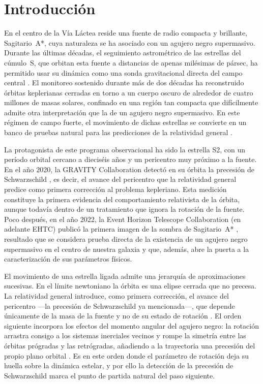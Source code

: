 \chapter{Introducción}
\label{sec:introduccion}

En el centro de la Vía Láctea reside una fuente de radio compacta y brillante, Sagitario~A*, cuya naturaleza se ha asociado con un agujero negro supermasivo. Durante las últimas décadas, el seguimiento astrométrico de las estrellas del cúmulo~S, que orbitan esta fuente a distancias de apenas milésimas de pársec, ha permitido usar su dinámica como una sonda gravitacional directa del campo central \cite{gillessen2017monitoring}. El monitoreo sostenido durante más de dos décadas ha reconstruido órbitas keplerianas cerradas en torno a un cuerpo oscuro de alrededor de cuatro millones de masas solares, confinado en una región tan compacta que difícilmente admite otra interpretación que la de un agujero negro supermasivo. En este régimen de campo fuerte, el movimiento de dichas estrellas se convierte en un banco de pruebas natural para las predicciones de la relatividad general \cite{parsa2017investigating}.

La protagonista de este programa observacional ha sido la estrella S2, con un período orbital cercano a dieciséis años y un pericentro muy próximo a la fuente. En el año 2020, la GRAVITY Collaboration detectó en su órbita la precesión de Schwarzschild \cite{gravity2020schwarzschild}, es decir, el avance del pericentro que la relatividad general predice como primera corrección al problema kepleriano. Esta medición constituye la primera evidencia del comportamiento relativista de la órbita, aunque todavía dentro de un tratamiento que ignora la rotación de la fuente. Poco después, en el año 2022, la Event Horizon Telescope Collaboration (en adelante EHTC) publicó la primera imagen de la sombra de Sagitario~A* \cite{eht2022sgraI}, resultado que se considera prueba directa de la existencia de un agujero negro supermasivo en el centro de nuestra galaxia y que, además, abre la puerta a la caracterización de sus parámetros físicos.

El movimiento de una estrella ligada admite una jerarquía de aproximaciones sucesivas. En el límite newtoniano la órbita es una elipse cerrada que no precesa. La relatividad general introduce, como primera corrección, el avance del pericentro —la precesión de Schwarzschild ya mencionada—, que depende únicamente de la masa de la fuente y no de su estado de rotación \cite{einstein1916fundamentos}. El orden siguiente incorpora los efectos del momento angular del agujero negro: la rotación arrastra consigo a los sistemas inerciales vecinos y rompe la simetría entre las órbitas prógradas y las retrógradas, añadiendo a la trayectoria una precesión del propio plano orbital \cite{bardeen1972rotating}. Es en este orden donde el parámetro de rotación deja su huella sobre la dinámica estelar, y por ello la detección de la precesión de Schwarzschild marca el punto de partida natural del paso siguiente.


